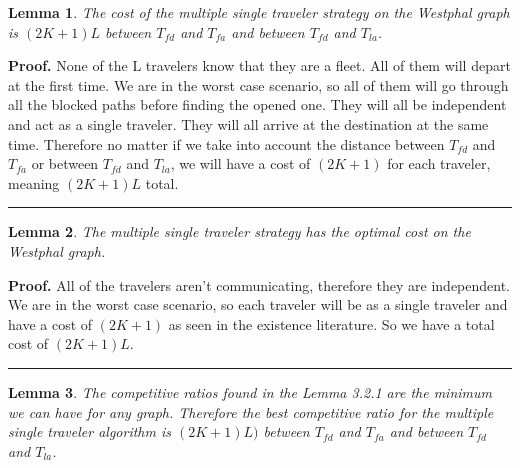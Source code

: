 \documentclass[a4paper, 10pt]{article}
\newtheorem{lemma}{Lemma}
\newenvironment{proof}[1][Proof]{\textbf{#1.} }{\ \rule{0.5em}{0.5em}}
\begin{document}
\begin{lemma} The cost of the multiple single traveler strategy on the Westphal graph is $(2K+1)L$ between $T_{fd}$ and $T_{fa}$ and between $T_{fd}$ and $T_{la}$.
\end{lemma}

\begin{proof} None of the L travelers know that they are a fleet. All of them will depart at the first time. We are in the worst case scenario, so all of them will go through all the blocked paths before finding the opened one. They will all be independent and act as a single traveler. They will all arrive at the destination at the same time. Therefore no matter if we take into account the distance between $T_{fd}$ and $T_{fa}$ or between $T_{fd}$ and $T_{la}$, we will have a cost of $(2K+1)$ for each traveler, meaning $(2K+1)L$ total.
\end{proof}

\begin{lemma}The multiple single traveler strategy has the optimal cost on the Westphal graph.
\end{lemma}

\begin{proof} All of the travelers aren't communicating, therefore they are independent. We are in the worst case scenario, so each traveler will be as a single traveler and have a cost of $(2K+1)$ as seen in the existence literature. So we have a total cost of $(2K+1)L$.
\end{proof}

\begin {lemma} The competitive ratios found in the Lemma 3.2.1 are the minimum we can have for any graph. Therefore the best competitive ratio for the multiple single traveler algorithm is $(2K+1)L)$ between $T_{fd}$ and $T_{fa}$ and between $T_{fd}$ and $T_{la}$.
\end{lemma}
\end{document}
